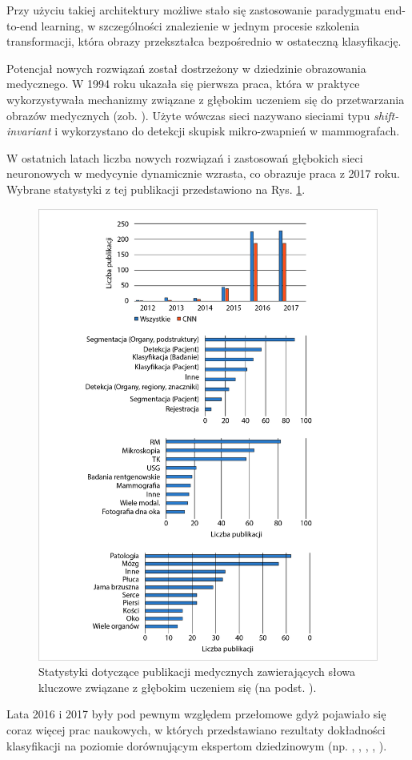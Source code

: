 Przy użyciu takiej architektury możliwe stało się zastosowanie paradygmatu end-to-end learning, w szczególności znalezienie w jednym procesie szkolenia transformacji, która obrazy przekształca bezpośrednio w ostateczną klasyfikację.  

Potencjał nowych rozwiązań został dostrzeżony w dziedzinie obrazowania medycznego. W 1994 roku ukazała się pierwsza praca, która w praktyce wykorzystywała mechanizmy związane z głębokim uczeniem się do przetwarzania obrazów medycznych (zob. \cite{Zhang1994}). Użyte wówczas sieci nazywano sieciami typu \textit{shift-invariant} \linebreak i wykorzystano do detekcji skupisk mikro-zwapnień w mammografach.

W ostatnich latach liczba nowych rozwiązań i zastosowań głębokich sieci neuronowych w medycynie dynamicznie wzrasta, co obrazuje praca \cite{Litjens2017} z 2017 roku. Wybrane statystyki z tej publikacji przedstawiono na Rys. \ref{DL_CAD_stats}.
\begin{figure}[h!]
	\centering
	\includegraphics[width=1\textwidth]{figures/DL_CAD_statystyka.jpg}
	\caption{Statystyki dotyczące publikacji medycznych zawierających słowa kluczowe związane z głębokim uczeniem się (na podst. \cite{Litjens2017}).}
	\label{DL_CAD_stats}
\end{figure}
Lata 2016 i 2017 były pod pewnym względem przełomowe gdyż pojawiało się coraz więcej prac naukowych, w których przedstawiano rezultaty dokładności klasyfikacji na poziomie dorównującym ekspertom dziedzinowym (np. \cite{Gulshan2016}, \cite{Esteva2017}, \cite{Tajbakhsh2016} \cite{Erickson2018}, \cite{LungChalenge}, \cite{Christiansen2018, Sarraf2016, Glasser2016, 2016arXiv160605718W}).

